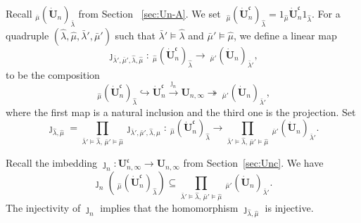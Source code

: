 \documentclass[12pt,reqno]{amsart}
\numberwithin{equation}{section}
\theoremstyle{definition}
\theoremstyle{plain}
\begin{document}
Recall  $_{\bar{\mu} } (\dot {\mathbf{U}}_n)_{\bar{\lambda} }$
from Section ~\ref{sec:Un-A}.
We set 
$\ _{\widehat \mu} (\dot {\mathbf{U}}^{\mathfrak{c}}_n)_{\widehat \lambda}
=1_{\widehat \mu} \dot {\mathbf{U}}^{\mathfrak{c}}_n 1_{\widehat \lambda}$.
For a quadruple $(\widehat \lambda, \widehat \mu, \bar{\lambda}' , \bar{\mu}' )$ such that
$\bar{\lambda}'  \models \widehat \lambda$ and $ \bar{\mu}'  \models \widehat \mu$,
we define a linear map
\[
\jmath_{ \bar{\lambda}' , \bar{\mu}' , \widehat \lambda, \widehat \mu} :
\ _{\widehat \mu} (\dot {\mathbf{U}}^{\mathfrak{c}}_n)_{\widehat \lambda}
\longrightarrow
\ _{\bar{\mu}' } (\dot {\mathbf{U}}_n)_{\bar{\lambda}' },
\]
to be the composition
\[
\ _{\widehat \mu} (\dot {\mathbf{U}}^{\mathfrak{c}}_n)_{\widehat \lambda}
\hookrightarrow
\dot {\mathbf{U}}^{\mathfrak{c}}_n
\overset{\jmath_n}{\longrightarrow}
{\mathbf{U}}_{n,\infty}
\twoheadrightarrow
\ _{\bar{\mu}' } (\dot {\mathbf{U}}_n)_{\bar{\lambda}' },
\]
where the first map is a natural inclusion and the third one is the projection.
Set
\[
\jmath_{\widehat \lambda, \widehat \mu}=
\prod_{ \bar{\lambda}'  \models \widehat \lambda,\, \bar{\mu}'  \models \widehat \mu}
\jmath_{ \bar{\lambda}' , \bar{\mu}' , \widehat \lambda, \widehat \mu}:
\ _{\widehat \mu} (\dot {\mathbf{U}}^{\mathfrak{c}}_n)_{\widehat \lambda}
\longrightarrow
\prod_{ \bar{\lambda}'  \models \widehat \lambda, \, \bar{\mu}'  \models \widehat \mu}
\ _{\bar{\mu}' } (\dot {\mathbf{U}}_n)_{\bar{\lambda}' }.
\]

Recall the imbedding $\jmath_{n} : {\mathbf{U}}^{\mathfrak{c}}_{n,\infty} \rightarrow {\mathbf{U}}_{n,\infty}$ from Section~\ref{sec:Unc}. 
We have
$$
\jmath_{n} ( \ _{\widehat \mu} (\dot {\mathbf{U}}^{\mathfrak{c}}_n)_{\widehat \lambda}) \subseteq
\prod_{\bar{\lambda}'  \models \widehat \lambda, \, \bar{\mu}'  \models \widehat \mu}
\ _{{\bar{\mu}'}} (\dot {\mathbf{U}}_n)_{\bar{\lambda}' }.
$$
The injectivity of $\jmath_n$ implies that 
the homomorphism $\jmath_{\widehat \lambda, \widehat \mu}$ is injective.
\end{document}
